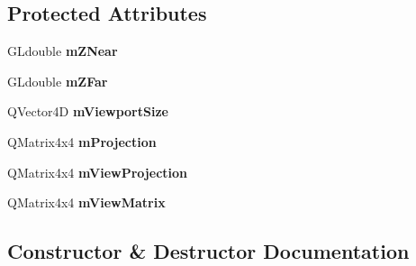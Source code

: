 \subsection*{Protected Attributes}
\begin{DoxyCompactItemize}
\item 
\mbox{\label{class_geometry_engine_1_1_geometry_item_utils_1_1_viewport_a91d2d0e2cd9fc08f2ff878300249fc04}} 
G\+Ldouble {\bfseries m\+Z\+Near}
\item 
\mbox{\label{class_geometry_engine_1_1_geometry_item_utils_1_1_viewport_a2406f22fb6240bad5f6b82e0829358a0}} 
G\+Ldouble {\bfseries m\+Z\+Far}
\item 
\mbox{\label{class_geometry_engine_1_1_geometry_item_utils_1_1_viewport_aaca6c28f08b882d9e22f8a7398f5a701}} 
Q\+Vector4D {\bfseries m\+Viewport\+Size}
\item 
\mbox{\label{class_geometry_engine_1_1_geometry_item_utils_1_1_viewport_af7c8597f8b85d16638b8f758e839c430}} 
Q\+Matrix4x4 {\bfseries m\+Projection}
\item 
\mbox{\label{class_geometry_engine_1_1_geometry_item_utils_1_1_viewport_a959a24f6b7b089948bfa8d678d6014f1}} 
Q\+Matrix4x4 {\bfseries m\+View\+Projection}
\item 
\mbox{\label{class_geometry_engine_1_1_geometry_item_utils_1_1_viewport_ad9fdc6df1b5f7873642ebbb4f8eb0a32}} 
Q\+Matrix4x4 {\bfseries m\+View\+Matrix}
\end{DoxyCompactItemize}


\subsection{Constructor \& Destructor Documentation}
\mbox{\label{class_geometry_engine_1_1_geometry_item_utils_1_1_viewport_a7533300b9cc61738b14fc0d6c67593ce}} 
